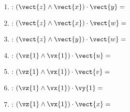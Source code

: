 \begin{multicols}{2}
\begin{enumerate}
\item : $\left(\vect{z}\wedge\vect{x}\right)\cdot\vect{y} = $
\item : $\left(\vect{z}\wedge\vect{x}\right)\cdot\vect{w} = $
\item : $\left(\vect{z}\wedge\vect{y}\right)\cdot\vect{w} = $
\item : $\left(\vz{1}\wedge\vx{1}\right)\cdot\vect{u} = $
\item : $\left(\vz{1}\wedge\vx{1}\right)\cdot\vect{v} = $
\item : $\left(\vz{1}\wedge\vx{1}\right)\cdot\vy{1} = $
\item : $\left(\vz{1}\wedge\vx{1}\right)\cdot\vect{x} = $

\end{enumerate}
\end{multicols}

